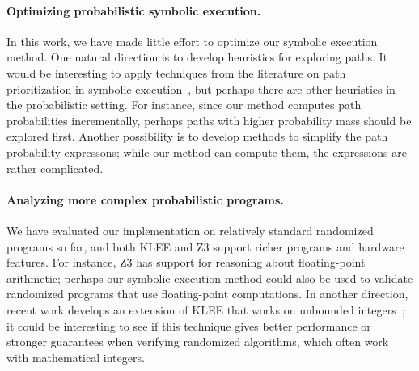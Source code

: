 \documentclass[acmsmall,review,anonymous]{acmart}\settopmatter{printfolios=true,printccs=false,printacmref=false}
\begin{document}
\paragraph*{Optimizing probabilistic symbolic execution.}
In this work, we have made little effort to optimize our symbolic execution
method. One natural direction is to develop heuristics for exploring paths. It
would be interesting to apply techniques from the literature on path
prioritization in symbolic execution~\citep{bihuan_2016, p4wn_2021}, but perhaps there are other
heuristics in the probabilistic setting. For instance, since our method computes
path probabilities incrementally, perhaps paths with higher probability mass
should be explored first. Another possibility is to develop methods to simplify
the path probability expressons; while our method can compute them, the
expressions are rather complicated.

\paragraph*{Analyzing more complex probabilistic programs.}
We have evaluated our implementation on relatively standard randomized programs
so far, and both KLEE and Z3 support richer programs and hardware features. For
instance, Z3 has support for reasoning about floating-point arithmetic; perhaps
our symbolic execution method could also be used to validate randomized programs
that use floating-point computations. In another direction, recent work develops
an extension of KLEE that works on unbounded integers~\citep{kapus_2019}; it
could be interesting to see if this technique gives better performance or
stronger guarantees when verifying randomized algorithms, which often work with
mathematical integers.

\begin{acks}                            %
\end{acks}
\end{document}
